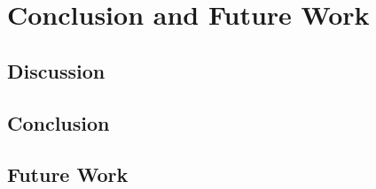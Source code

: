 \chapter{Conclusion and Future Work}
\label{cf}




\section{Discussion}
\label{cf:Discussion}


\section{Conclusion}
\label{cf:Conclusion}



\section{Future Work}
\label{cf:Future Work}









